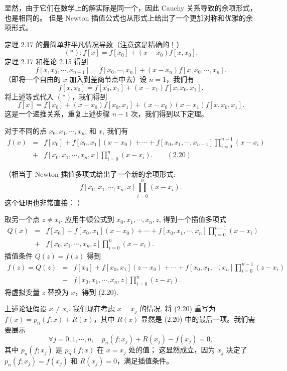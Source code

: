 \documentclass[a4paper]{ctexart}
\begin{document}
显然，由于它们在数学上的解实际是同一个，因此 Cauchy 关系导致的余项形式，也是相同的。
但是 Newton 插值公式也从形式上给出了一个更加对称和优雅的余项形式。

 定理 2.17 的最简单非平凡情况导致（注意这是精确的！）
\[
(\ast) : f [x] = f [x_0 ] + (x - x_0 )f [x, x_0 ].
\]
定理 2.17 和推论 2.15 得到
\[
f [x, x_0 , \cdots , x_{n-1}] = f [x_0 , \cdots , x_n ] + (x - x_n )f [x, x_0 , \cdots , x_n].
\]
（即将一个自由的 $x$ 加入到差商节点中去）设 $n = 1$，我们有
\[
f [x, x_0 ] = f [x_0 , x_1] + (x - x_1 )f [x, x_0 , x_1].
\]
将上述等式代入 $(\ast)$，我们得到
\[
f [x] = f [x_0 ] + (x - x_0 )f [x_0 , x_1 ] + (x - x_0)(x - x_1)f [x, x_0, x_1].
\]
这是一个递推关系，重复上述步骤 $n - 1$ 次，我们得到以下定理。

 对于不同的点 $x_0 , x_1 , \cdots , x_n$, 和 $x$, 我们有
\begin{eqnarray*}
  f (x) &=& f [x_0 ] + f [x_0 , x_1 ](x - x_0 ) + \cdots + f [x_0, x_1, \cdots , x_{n-1} ] \prod_{i=0}^{n-1} (x - x_i ) \\
  &+& f [x_0, x_1, \cdots , x_n , x] \prod_{i=0}^{n} (x - x_i ). \qquad \mathrm{(2.20)}
\end{eqnarray*}

（相当于 Newton 插值多项式给出了一个新的余项形式:
\[
  f [x_0, x_1, \cdots , x_n , x] \prod_{i=0}^{n} (x - x_i ).
\]
这个证明也非常直接：
）

 取另一个点 $z \neq x_i$. 
应用牛顿公式到 $x_0 , x_1 , \cdots , x_n , z$, 得到一个插值多项式
\begin{eqnarray*}
Q(x) &=& f [x_0] + f [x_0 , x_1](x - x_0) + \cdots + f [x_0 , x_1 , \cdots , x_n] 
\prod_{i=0}^{n-1} (x - x_i )\\
&+& f [x_0 , x_1 , \cdots , x_n , z] \prod_{i=0}^{n} (x - x_i ).
\end{eqnarray*}
插值条件 $Q(z) = f(z)$ 得到
\begin{eqnarray*}
f(z) = Q(z) &=& f [x_0 ] + f [x_0 , x_1 ](z - x_0) + \cdots + f [x_0 , x_1 , \cdots , x_n ] 
\prod_{i=0}^{n-1} (z - x_i )\\
&+& f [x_0 , x_1 , \cdots , x_n , z] \prod_{i=0}^{n} (z - x_i ).
\end{eqnarray*}
将虚拟变量 $z$ 替换为 $x$，得到 (2.20).

上述论证假设 $x \neq x_i$. 我们现在考虑 $x = x_j$ 的情况. 将 (2.20) 重写为 
$f(x) = p_n(f; x) + R(x)$，其中 $R(x)$ 显然是 (2.20) 中的最后一项。我们需要展示
\[
\forall j = 0, 1, \cdots , n, \quad p_n(f ; x_j ) + R(x_j ) - f (x_j ) = 0,
\]
其中 $p_n (f ; x_j )$ 是 $p_n(f ; x)$ 在 $x = x_j$ 处的值；
这显然成立，因为 $x_j$ 决定了 $p_n(f ; x_j ) = f (x_j )$ 和 $R(x_j ) = 0$，满足插值条件。
\end{document}
